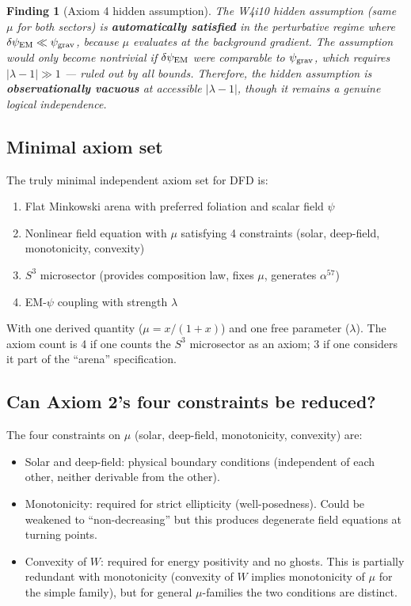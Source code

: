 \documentclass[11pt]{article}
\newtheorem{finding}{Finding}
\newcommand{\lbone}{|\lambda - 1|}
\begin{document}
\begin{finding}[Axiom 4 hidden assumption]
\label{find:axiom4}
The W4i10 hidden assumption (same $\mu$ for both sectors) is
\textbf{automatically satisfied} in the perturbative regime where
$\delta\psi_{\rm EM} \ll \psi_{\rm grav}$, because $\mu$ evaluates
at the background gradient. The assumption would only become
nontrivial if $\delta\psi_{\rm EM}$ were comparable to $\psi_{\rm grav}$,
which requires $\lbone \gg 1$ --- ruled out by all bounds.
Therefore, the hidden assumption is \textbf{observationally vacuous}
at accessible $\lbone$, though it remains a genuine logical
independence.
\end{finding}

\subsection{Minimal axiom set}

The truly minimal independent axiom set for DFD is:

\begin{enumerate}[nosep]
\item Flat Minkowski arena with preferred foliation and scalar
  field $\psi$
\item Nonlinear field equation with $\mu$ satisfying 4 constraints
  (solar, deep-field, monotonicity, convexity)
\item $S^3$ microsector (provides composition law, fixes $\mu$,
  generates $\alpha^{57}$)
\item EM-$\psi$ coupling with strength $\lambda$
\end{enumerate}

With one derived quantity ($\mu = x/(1+x)$) and one free parameter
($\lambda$). The axiom count is 4 if one counts the $S^3$ microsector
as an axiom; 3 if one considers it part of the ``arena'' specification.

\subsection{Can Axiom 2's four constraints be reduced?}

The four constraints on $\mu$ (solar, deep-field, monotonicity,
convexity) are:
\begin{itemize}[nosep]
\item Solar and deep-field: physical boundary conditions (independent
  of each other, neither derivable from the other).
\item Monotonicity: required for strict ellipticity (well-posedness).
  Could be weakened to ``non-decreasing'' but this produces degenerate
  field equations at turning points.
\item Convexity of $W$: required for energy positivity and no ghosts.
  This is partially redundant with monotonicity (convexity of $W$
  implies monotonicity of $\mu$ for the simple family), but for
  general $\mu$-families the two conditions are distinct.
\end{itemize}
\end{document}
